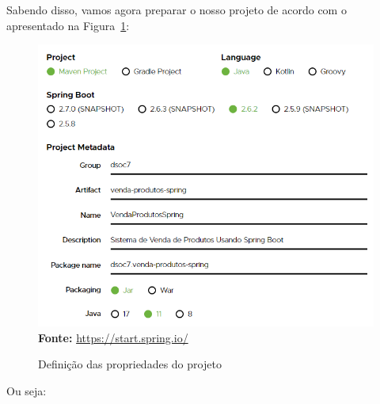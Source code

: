 Sabendo disso, vamos agora preparar o nosso projeto de acordo com o apresentado na Figura~\ref{fig:cap10SpringInitializrConfProjeto01}:

\FloatBarrier
\begin{figure}[!htbp]
    \centering
    \caption{Definição das propriedades do projeto}
    \includegraphics[scale=0.7]{imagens/cap10SpringInitializrConfProjeto01}
    \\\textbf{Fonte:} \url{https://start.spring.io/}
    \label{fig:cap10SpringInitializrConfProjeto01}
\end{figure}
\FloatBarrier

Ou seja:

